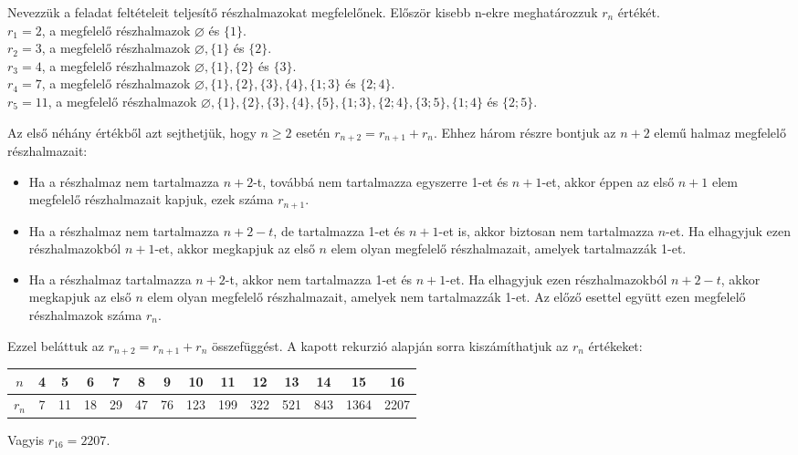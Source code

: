 \begin{solution}
	Nevezzük a feladat feltételeit teljesítő részhalmazokat megfelelőnek.
	Először kisebb n-ekre meghatározzuk $r_{n}$ értékét.\\
	$r_{1}=2$, a megfelelő részhalmazok $\varnothing$ és $\{1\}$.\\
	$r_{2}=3$, a megfelelő részhalmazok $\varnothing,\{1\}$ és $\{2\}$.\\
	$r_{3}=4$, a megfelelő részhalmazok $\varnothing,\{1\},\{2\}$ és
	$\{3\}$.\\
	$r_{4}=7$, a megfelelő részhalmazok $\varnothing,\{1\},\{2\},\{3\},\{4\},\{1;3\}$
	és $\{2;4\}$.\\
	$r_{5}=11$, a megfelelő részhalmazok $\varnothing,\{1\},\{2\},\{3\},\{4\},\{5\},\{1;3\},\{2;4\},\{3;5\},\{1;4\}$
	és $\{2;5\}$.
	
	Az első néhány értékből azt sejthetjük, hogy $n\geq2$ esetén $r_{n+2}=r_{n+1}+r_{n}$.
	Ehhez három részre bontjuk az $n+2$ elemű halmaz megfelelő részhalmazait:
	\begin{itemize}
		\item Ha a részhalmaz nem tartalmazza $n+2$-t, továbbá nem tartalmazza
		egyszerre 1-et és $n+1$-et, akkor éppen az első $n+1$ elem megfelelő
		részhalmazait kapjuk, ezek száma $r_{n+1}$. 
		\item Ha a részhalmaz nem tartalmazza $n+2-t$, de tartalmazza 1-et és $n+1$-et
		is, akkor biztosan nem tartalmazza $n$-et. Ha elhagyjuk ezen részhalmazokból
		$n+1$-et, akkor megkapjuk az első $n$ elem olyan megfelelő részhalmazait,
		amelyek tartalmazzák 1-et. 
		\item Ha a részhalmaz tartalmazza $n+2$-t, akkor nem tartalmazza 1-et és
		$n+1$-et. Ha elhagyjuk ezen részhalmazokból $n+2-t$, akkor megkapjuk
		az első $n$ elem olyan megfelelő részhalmazait, amelyek nem tartalmazzák
		1-et. Az előző esettel együtt ezen megfelelő részhalmazok száma $r_{n}$. 
	\end{itemize}
	Ezzel beláttuk az $r_{n+2}=r_{n+1}+r_{n}$ összefüggést. A kapott
	rekurzió alapján sorra kiszámíthatjuk az $r_{n}$ értékeket:
	\begin{center}
		\begin{tabular}{|c|c|c|c|c|c|c|c|c|c|c|c|c|c|}
			\hline 
			$n$ & 4 & 5 & 6 & 7 & 8 & 9 & 10 & 11 & 12 & 13 & 14 & 15 & 16\tabularnewline
			\hline 
			$r_{n}$ & 7 & 11 & 18 & 29 & 47 & 76 & 123 & 199 & 322 & 521 & 843 & 1364 & 2207\tabularnewline
			\hline 
		\end{tabular}
		\par\end{center}
	Vagyis $r_{16}=2207$.\\
	
\end{solution}
